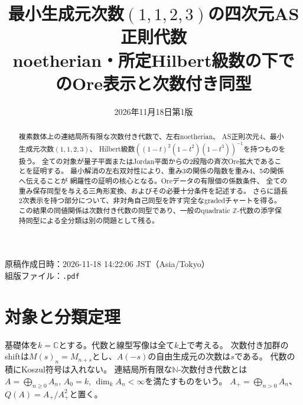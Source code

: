\documentclass[11pt,a4paper]{ltjsarticle}
\title{最小生成元次数$(1,1,2,3)$の四次元AS正則代数\\
\large noetherian・所定Hilbert級数の下でのOre表示と次数付き同型}
\author{}
\date{2026年11月18日\quad 第1版}
\theoremstyle{definition}
\newcommand{\ZZ}{\mathbb Z}
\begin{document}
\hypersetup{pageanchor=false}
\begin{titlepage}
\maketitle
\thispagestyle{empty}
\begin{abstract}
複素数体上の連結局所有限な次数付き代数で、左右noetherian、
AS正則次元4、最小生成元次数$(1,1,2,3)$、
Hilbert級数$((1-t)^2(1-t^2)(1-t^3))^{-1}$を持つものを扱う。
全ての対象が量子平面またはJordan平面からの2段階の斉次Ore拡大であることを証明する。
最小解消の左右双対性により、重み3の関係の階数を重み4、5の関係へ伝えることが
網羅性の証明の核心となる。Oreデータの有限個の係数条件、
全ての重み保存同型を与える三角形変換、およびその必要十分条件を記述する。
さらに語長2次表示を持つ部分について、非対角自己同型を許す完全なgradedチャートを得る。
この結果の同値関係は次数付き代数の同型であり、一般のquadratic
$\ZZ$-代数の添字保持同型による全分類は別の問題として残る。
\end{abstract}
\vfill
\begin{center}
原稿作成日時：2026-11-18 14:22:06 JST（Asia/Tokyo）\\
組版ファイル：\texttt{\jobname.pdf}
\end{center}
\end{titlepage}
\hypersetup{pageanchor=true}
\tableofcontents
\clearpage
{}

\section{対象と分類定理}\label{sec:theorem}
基礎体を$k=\mathbb C$とする。代数と線型写像は全て$k$上で考える。
次数付き加群のshiftは$M(s)_n=M_{n+s}$とし、$A(-s)$の自由生成元の次数は$s$である。
代数の積にKoszul符号は入れない。
連結局所有限な$\mathbb N$-次数付き代数とは
$A=\bigoplus_{n\geq0}A_n$, $A_0=k$, $\dim_k A_n<\infty$を満たすものをいう。
$A_+=\bigoplus_{n>0}A_n$、$Q(A)=A_+/A_+^2$と置く。
\end{document}
